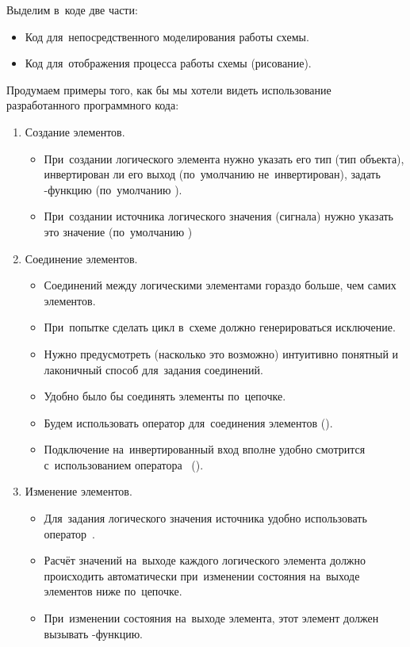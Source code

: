 \bigskip Выделим в~коде две части:
\begin{itemize}
    \item Код для~непосредственного моделирования работы схемы.
    \item Код для~отображения процесса работы схемы (рисование).
\end{itemize}

\bigskip Продумаем примеры того, как бы мы хотели видеть использование разработанного программного кода:
\begin{enumerate}
    \item Создание элементов.
    \begin{itemize}
        \item При~создании логического элемента нужно указать его тип (тип объекта), инвертирован ли его выход (по~умолчанию не~инвертирован), задать -функцию (по~умолчанию ).
        \item При~создании источника логического значения (сигнала) нужно указать это значение (по~умолчанию )
    \end{itemize}

    \item Соединение элементов.
    \begin{itemize}
        \item Соединений между логическими элементами гораздо больше, чем самих элементов.
        \item При~попытке сделать цикл в~схеме должно генерироваться исключение.
        \item Нужно предусмотреть (насколько это возможно) интуитивно понятный и лаконичный способ для~задания соединений.
        \item Удобно было бы соединять элементы по~цепочке.
        \item Будем использовать оператор \code{>>} для~соединения элементов ().
        \item Подключение на~инвертированный вход вполне удобно смотрится с~использованием оператора~\code{\textasciitilde} ().
    \end{itemize}

    \item Изменение элементов.
    \begin{itemize}
        \item Для~задания логического значения источника удобно использовать оператор~\code{=}.
        \item Расчёт значений на~выходе каждого логического элемента должно происходить автоматически при~изменении состояния на~выходе элементов ниже по~цепочке.
        \item При~изменении состояния на~выходе элемента, этот элемент должен вызывать -функцию.
    \end{itemize}


\end{enumerate}
